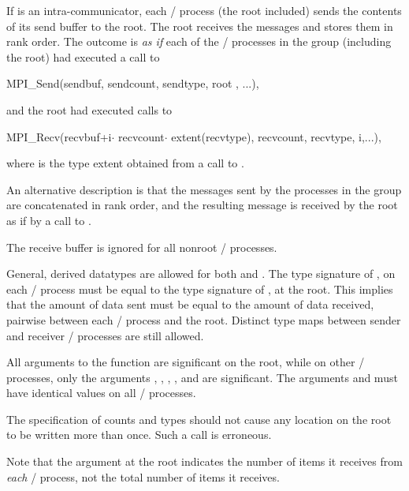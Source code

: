 If  is an intra-communicator,
each \MPI/ process (the root included) sends the contents of its send
buffer to the root.  The root receives the messages and
stores them in rank order.
The outcome is \emph{as if} each of the  \MPI/ processes in the group
(including the root) had executed a call to
\begin{mpicodeblock}
MPI\_Send(sendbuf, sendcount, sendtype, root , ...),
\end{mpicodeblock}
\noindent and the
root had executed  calls to
\begin{mpicodeblock}
MPI\_Recv(recvbuf+i$\cdot$ recvcount$\cdot$ extent(recvtype), recvcount, recvtype, i,...),
\end{mpicodeblock}
\noindent where  is the type extent obtained from a call to
.

An alternative description is that the  messages sent by the
processes in the group are concatenated in rank order, and the
resulting message is received by the root as if by a call to
.

The receive buffer is ignored for all nonroot \MPI/ processes.

General, derived datatypes are allowed for both 
and .
The type signature of ,  on
each \MPI/ process
must be equal to the type signature of
,  at the root.
This implies that the amount of data sent must be equal to the
amount of data received, pairwise between each \MPI/ process and the root.
Distinct type maps between sender and receiver \MPI/ processes are still allowed.

All arguments to the function are significant on the root,
while on other \MPI/ processes, only the arguments , ,
, ,
and
 are significant.
The arguments  and 
must have identical values on all \MPI/ processes.

The specification of counts and types
should not cause any location on the root to be written more than
once.  Such a call is erroneous.


Note that the  argument at the root indicates
the number of items it receives from \emph{each} \MPI/ process, not the total number
of items it receives.

